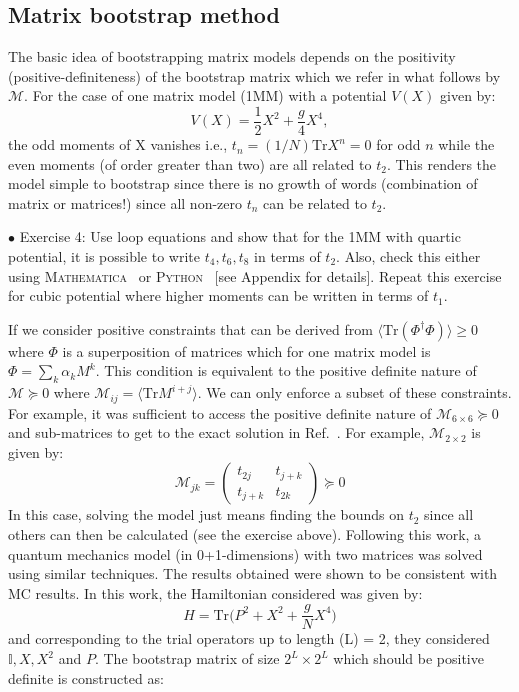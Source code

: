 \documentclass[11pt]{article}
\newcommand{\MA}{\textsc{Mathematica}}
\newcommand{\PY}{\textsc{Python}}
\begin{document}
\subsection{Matrix bootstrap method}
The basic idea of bootstrapping matrix models depends on the 
positivity (positive-definiteness) of the bootstrap matrix which we refer in what follows 
by $\mathcal{M}$. For the case of one matrix model (1MM) with a potential $V(X)$ given by: 
\begin{equation}
    V(X) = \frac12 X^2 + \frac{g}{4} X^4, 
\end{equation}
the odd moments of X vanishes i.e., $ t_{n} = (1/N)\mbox{Tr} X^n = 0$ for odd $n$
while the even moments (of order greater than two) are all related to $t_{2}$. This renders the 
model simple to bootstrap since there is no growth of words (combination of matrix or matrices!)
since all non-zero $t_{n}$ can be related to $t_{2}$. 
\begin{mdframed}[backgroundcolor=blue!3] 
	\textsc{} 
	$\bullet$ Exercise 4: Use loop equations and show that for the 1MM with quartic potential, it is possible to write $t_{4}, t_{6}, t_{8}$ in terms of $t_{2}$. Also, check this either using \MA~ or \PY~ [see Appendix for details]. 
Repeat this exercise for cubic potential where higher moments can be written in terms of $t_1$.  
\end{mdframed} 
If we consider positive constraints that can be derived from $\langle \mbox{Tr}(\Phi^{\dagger}\Phi) \rangle \ge 0 $
where $\Phi$ is a superposition of matrices which for one matrix model is 
$ \Phi = \sum_{k} \alpha_{k} M^{k}$. This condition is equivalent to the positive definite nature of
$\mathcal{M} \succeq 0 $ where $ \mathcal{M}_{ij} = \langle \mbox{Tr} M^{i+j} \rangle$. 
We can only enforce a subset of these constraints. For example, it was sufficient to 
access the positive definite nature of $\mathcal{M}_{6 \times 6} \succeq 0 $ 
and sub-matrices to get to the exact solution in Ref.~\cite{Lin:2020mme}. 
For example, $\mathcal{M}_{2 \times 2}$ is given by:
\begin{equation}
	\mathcal{M}_{jk} = 
	\begin{pmatrix}
		t_{2j} & t_{j+k}  \\
		t_{j+k} & t_{2k}  
	\end{pmatrix}  \succeq 0
\end{equation}
In this case, solving the model just means finding the bounds on $t_{2}$ 
since all others can then be calculated (see the exercise above). 
Following this work, a quantum mechanics 
model (in 0+1-dimensions) with two matrices was solved using similar techniques. 
The results obtained were shown to be consistent with MC results. 
In this work, the Hamiltonian considered was given by:
\begin{equation}
H = \mbox{Tr} \Big( P^2 + X^2 + \frac{g}{N} X^4 \Big)
\end{equation}
and corresponding to the trial operators up to length (L) = 2, 
they considered $ \mathbb{I}, X, X^{2}$ and $P$. The bootstrap matrix
of size $2^L \times 2^L$ which should be positive definite is constructed as:
\end{document}
